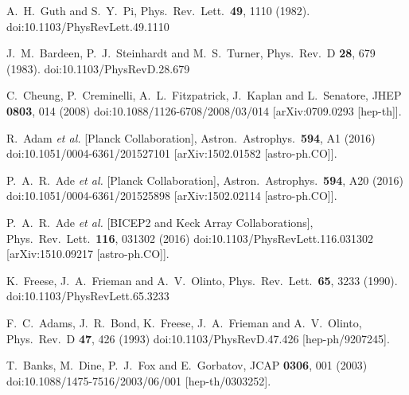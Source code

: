 \documentclass[12pt]{article}
\begin{document}
\begin{thebibliography}{99}
  A.~H.~Guth and S.~Y.~Pi,
  Phys.\ Rev.\ Lett.\  {\bf 49}, 1110 (1982).
  doi:10.1103/PhysRevLett.49.1110

  J.~M.~Bardeen, P.~J.~Steinhardt and M.~S.~Turner,
  Phys.\ Rev.\ D {\bf 28}, 679 (1983).
  doi:10.1103/PhysRevD.28.679

  C.~Cheung, P.~Creminelli, A.~L.~Fitzpatrick, J.~Kaplan and L.~Senatore,
  JHEP {\bf 0803}, 014 (2008)
  doi:10.1088/1126-6708/2008/03/014
  [arXiv:0709.0293 [hep-th]].

  R.~Adam {\it et al.} [Planck Collaboration],
  Astron.\ Astrophys.\  {\bf 594}, A1 (2016)
  doi:10.1051/0004-6361/201527101
  [arXiv:1502.01582 [astro-ph.CO]].

  P.~A.~R.~Ade {\it et al.} [Planck Collaboration],
  Astron.\ Astrophys.\  {\bf 594}, A20 (2016)
  doi:10.1051/0004-6361/201525898
  [arXiv:1502.02114 [astro-ph.CO]].

  P.~A.~R.~Ade {\it et al.} [BICEP2 and Keck Array Collaborations],
  Phys.\ Rev.\ Lett.\  {\bf 116}, 031302 (2016)
  doi:10.1103/PhysRevLett.116.031302
  [arXiv:1510.09217 [astro-ph.CO]].

  K.~Freese, J.~A.~Frieman and A.~V.~Olinto,
  Phys.\ Rev.\ Lett.\  {\bf 65}, 3233 (1990).
  doi:10.1103/PhysRevLett.65.3233

  F.~C.~Adams, J.~R.~Bond, K.~Freese, J.~A.~Frieman and A.~V.~Olinto,
  Phys.\ Rev.\ D {\bf 47}, 426 (1993)
  doi:10.1103/PhysRevD.47.426
  [hep-ph/9207245].

  T.~Banks, M.~Dine, P.~J.~Fox and E.~Gorbatov,
  JCAP {\bf 0306}, 001 (2003)
  doi:10.1088/1475-7516/2003/06/001
  [hep-th/0303252].


\end{thebibliography}
\end{document}
